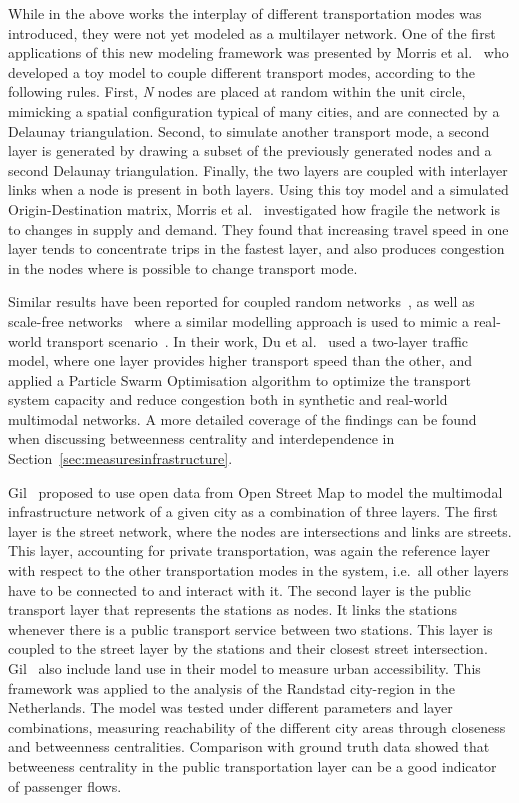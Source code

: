 While in the above works the interplay of different transportation modes was introduced, they were not yet  modeled as a multilayer network. One of the first applications of this new modeling framework was presented by Morris et al.~\cite{morris2012transport} who developed a toy model to couple different transport modes, according to the following rules. First, \textit{N} nodes are placed at random within the unit circle, mimicking a spatial configuration typical of many cities, and are connected by a Delaunay triangulation. Second, to simulate another transport mode, a second layer is generated by drawing a subset of the previously generated nodes and a second Delaunay triangulation. Finally, the two layers are coupled with interlayer links when a node is present in both layers. Using this toy model and a simulated Origin-Destination matrix, Morris et al.~\cite{morris2012transport} investigated how fragile the network is to changes in supply and demand. They found that increasing travel speed in one layer tends to concentrate trips in the fastest layer, and also produces congestion in the nodes where is possible to change transport mode.

Similar results have been reported for coupled random networks~\cite{gao2017comprehensive}, as well as scale-free networks~\cite{zhuo2011traffic} where a similar modelling approach is used to mimic a real-world transport scenario~\cite{du2016physics}. In their work, Du et al.~\cite{du2016physics} used a two-layer traffic model, where one layer provides higher transport speed than the other, and applied a Particle Swarm Optimisation algorithm to optimize the transport system capacity and reduce congestion both in synthetic and real-world multimodal networks. A more detailed coverage of the findings can be found when discussing betweenness centrality and interdependence in Section~\ref{sec:measuresinfrastructure}. 

Gil~\cite{gil2014configuration} proposed to use open data from Open Street Map to model the multimodal infrastructure network of a given city as a combination of three layers. The first layer is the street network, where the nodes are intersections and links are streets. This layer, accounting for private transportation, was again the reference layer with respect to the other transportation modes in the system, i.e.~all other layers have to be connected to and interact with it. The second layer is the public transport layer that represents the stations as nodes. It links the stations whenever there is a public transport service between two stations. This layer is coupled to the street layer by the stations and their closest street intersection. Gil~\cite{gil2014configuration} also include land use in their model to measure urban accessibility. This framework was applied to the analysis of the Randstad city-region in the Netherlands. The model was tested under different parameters and layer combinations, measuring reachability of the different city areas through closeness and betweenness centralities. Comparison with ground truth data showed that betweeness centrality in the public transportation layer can be a good indicator of passenger flows.

